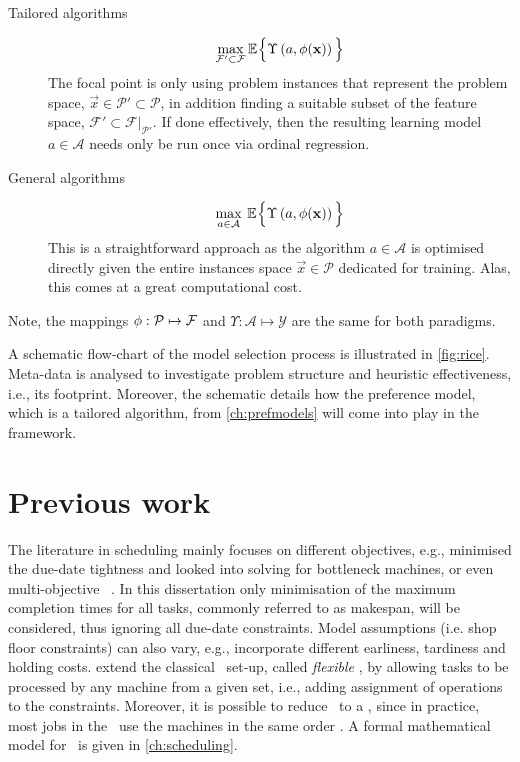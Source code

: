 \begin{description}
  \item[Tailored algorithms] 
  \begin{equation}
    \max_{\mathcal{F}'\subset\mathcal{F}} 
    {\mathbb E}_{ }\Big\{\Upsilon\left(a,{\mathbf{\phi}}(\mathbf{x})\right)\Big\}
  \end{equation}
  The  focal point is only using  problem instances that represent the problem 
  space, $\vec{x}\in\mathcal{P'}\subset\mathcal{P}$, in addition finding a 
  suitable subset of the feature space, 
  $\mathcal{F}'\subset\mathcal{F}|_{\mathcal{P}'}$. If done effectively, then 
  the resulting learning model $a\in\mathcal{A}$ needs only be run once via 
  ordinal regression.
  \item[General algorithms]
  \begin{equation}
    \max_{a\in\mathcal{A}}\:{\mathbb E}_{ }\Big\{\Upsilon\left(a,{\mathbf{\phi}}(\mathbf{x})\right)\Big\}
  \end{equation}
  This is a straightforward  approach as the algorithm $a\in\mathcal{A}$ is 
  optimised directly given the entire instances space $\vec{x}\in\mathcal{P}$ 
  dedicated for training. Alas, this comes at a great computational cost.
\end{description}
Note, the mappings ${\mathbf{\phi}}:\mathcal{P}\mapsto\mathcal{F}$ and 
$\Upsilon:\mathcal{A}\mapsto\mathcal{Y}$ are the same for both paradigms.

A schematic flow-chart of the model selection process is illustrated in 
\cref{fig:rice}. 
Meta-data is analysed to investigate problem structure and heuristic 
effectiveness, i.e., its footprint.
Moreover, the schematic details how the preference model, which is a tailored 
algorithm, from \cref{ch:prefmodels} will come into play in the framework.



\section{Previous work}
The literature in scheduling mainly focuses on different objectives, 
e.g., \citet{Chang96} minimised the due-date tightness and 
\citet{Drobouchevitch2000,Gao2007} looked into solving for bottleneck machines, 
or even multi-objective \JSP\ \citep{Vazquez-Rodriguez09,Xia2005,Tay08}.
In this dissertation only minimisation of the maximum completion times for all 
tasks, commonly referred to as makespan, will be considered, thus 
ignoring all due-date constraints. 
Model assumptions (i.e. shop floor constraints) can also vary, e.g., 
\citet{Thiagarajan05} incorporate different earliness, tardiness and holding 
costs. 
\citet{Brandimarte1993,Xia2005,Pezzella2008} extend the classical \JSP\ set-up, 
called \emph{flexible} \jsp, by allowing tasks to be processed by any machine 
from a given set, i.e., adding assignment of operations to the constraints.
Moreover, it is possible to reduce \JSP\ to a \FSP, since in practice, 
most jobs in the \jsp\ use the machines in the same order 
\citep{Guinet1998,Ho2007}. 
A formal mathematical model for \JSP\ is given in \cref{ch:scheduling}.

